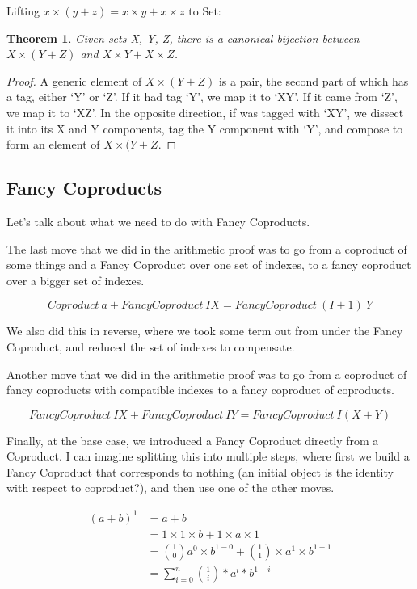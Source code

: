 \documentclass{proc-l}
\newtheorem{theorem}{Theorem}[section]
\theoremstyle{definition}
\theoremstyle{remark}
\numberwithin{equation}{section}
\begin{document}
Lifting \(x \times (y + z) = x \times y + x \times z\) to Set:

\begin{theorem}
Given sets X, Y, Z, there is a canonical bijection between \(X \times (Y + Z)\) and \(X \times Y + X \times Z\).
\end{theorem}

\begin{proof}
A generic element of \(X \times (Y + Z)\) is a pair, the second part of which has a tag, either `Y' or `Z'. If it had tag `Y', we map it to `XY'. If it came from `Z', we map it to `XZ'. In the opposite direction, if was tagged with `XY', we dissect it into its X and Y components, tag the Y component with `Y', and compose to form an element of \(X \times (Y + Z\). 
\end{proof}

\subsection{Fancy Coproducts}

Let's talk about what we need to do with Fancy Coproducts.

The last move that we did in the arithmetic proof was
to go from a coproduct of some things and a Fancy Coproduct over one set of indexes, to a fancy coproduct over a bigger set of indexes.

\[
Coproduct~a + FancyCoproduct~I X = FancyCoproduct~(I+1)~Y
\]

We also did this in reverse, where we took some term out from under the Fancy Coproduct, and reduced the set of indexes to compensate.

Another move that we did in the arithmetic proof was
to go from a coproduct of fancy coproducts with compatible indexes to a fancy coproduct of coproducts.

\[
FancyCoproduct~I X + FancyCoproduct~I Y = FancyCoproduct~I (X + Y)
\]


Finally, at the base case, we introduced a Fancy Coproduct directly from a Coproduct. I can imagine splitting this into multiple steps,
where first we build a Fancy Coproduct that corresponds to nothing (an initial object is the identity with respect to coproduct?), and then use one of the other moves.





\begin{align*}
(a + b)^1 & = a + b \\ %
& = 1 \times 1 \times b + 1 \times a \times 1 \\ %
& = {1 \choose 0} a^0 \times b^{1-0} + {1 \choose 1} \times a^1 \times b^{1-1} \\ %
& = \sum_{i=0}^n {1 \choose i} * a^i * b^{1-i} %
\end{align*}
\end{document}
